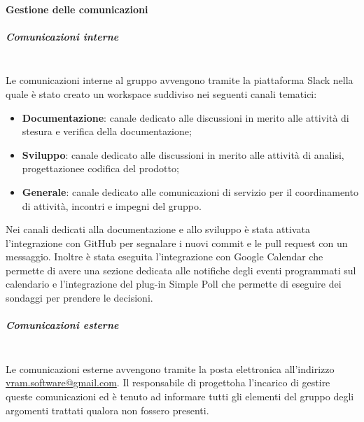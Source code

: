 		\paragraph{Gestione delle comunicazioni}
			\subparagraph{Comunicazioni interne}\mbox{}\\ [1mm]
				Le comunicazioni interne al gruppo avvengono tramite la piattaforma Slack nella quale è stato creato un workspace suddiviso nei seguenti canali tematici:
				\begin{itemize}
					\item \textbf{Documentazione}: canale dedicato alle discussioni in merito alle attività di stesura e verifica della documentazione;
					\item \textbf{Sviluppo}: canale dedicato alle discussioni in merito alle attività di analisi, progettazione\glosp e codifica del prodotto\glo;
					\item \textbf{Generale}: canale dedicato alle comunicazioni di servizio per il coordinamento di attività, incontri e impegni del gruppo.
				\end{itemize}
				Nei canali dedicati alla documentazione e allo sviluppo è stata attivata l'integrazione con GitHub per segnalare i nuovi commit e le pull request con un messaggio.
				Inoltre è stata eseguita l'integrazione con Google Calendar che permette di avere una sezione dedicata alle notifiche degli eventi programmati sul calendario e l'integrazione del plug-in Simple Poll che permette di eseguire dei sondaggi per prendere le decisioni.
			\subparagraph{Comunicazioni esterne}\mbox{}\\ [1mm]
				Le comunicazioni esterne avvengono tramite la posta elettronica all'indirizzo \url{vram.software@gmail.com}.
				Il responsabile di progetto\glosp ha l'incarico di gestire queste comunicazioni ed è tenuto ad informare tutti gli elementi del gruppo degli argomenti trattati qualora non fossero presenti.
